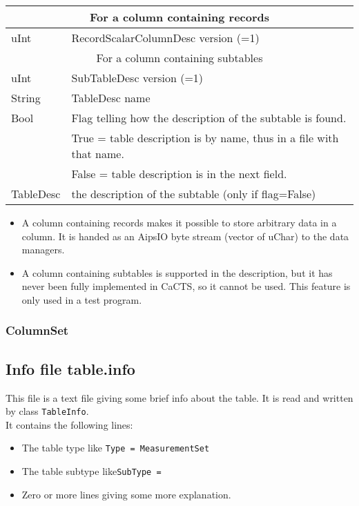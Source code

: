 \begin{tabular}{|l|p{13cm}|}
  \hline
  \multicolumn{2}{|c|}{For a column containing records} \\
  \hline
  uInt & RecordScalarColumnDesc version (=1) \\
  \hline
  \multicolumn{2}{|c|}{For a column containing subtables} \\
  \hline
  uInt & SubTableDesc version (=1) \\
  String & TableDesc name \\
  Bool & Flag telling how the description of the subtable is found.
  \tabularnewline & True = table description is by name, thus in a
  file with that name.
  \tabularnewline & False = table description is in the next field. \\
  TableDesc & the description of the subtable (only if flag=False) \\
  \hline
\end{tabular}
\vspace{0.15in}

\begin{itemize}
\item A column containing records makes it possible to store arbitrary
  data in a column. It is handed as an AipsIO byte stream (vector of
  uChar) to the data managers.
\item A column containing subtables is supported in the description, but it
  has never been fully implemented in CaCTS, so it cannot be used. This
  feature is only used in a test program.
\end{itemize}

\subsubsection{ColumnSet}

\subsection{Info file table.info}
This file is a text file giving some brief info about the table. It is
read and written by class \texttt{TableInfo}.
\\It contains the following lines:
\begin{itemize}
\item The table type like \texttt{Type = MeasurementSet}
\item The table subtype like\texttt{SubType =}
\item Zero or more lines giving some more explanation.
\end{itemize}

